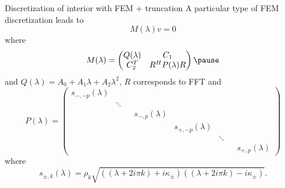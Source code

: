 \documentclass[10pt]{beamer}
\begin{document}
\begin{frame}
{Discretization of interior with FEM + truncation}
A particular type of FEM discretization leads to 
\[
  M(\lambda)v=0
\]
where
\[
  M(\lambda)=
  \begin{pmatrix}
    Q(\lambda) & C_1\\
    C_2^T & R^HP(\lambda)R
  \end{pmatrix}\pause
\]
and $Q(\lambda)=A_0+A_1\lambda+A_2\lambda^2$, $R$ corresponds to FFT \pause and
\[
  P(\lambda)=
  \begin{pmatrix}
    s_{-,-p}(\lambda)&   &   &        \\
    &  \ddots &   &   &   &  \\
    &   &   & s_{-,p}(\lambda)    \\
    &&&&s_{+,-p}(\lambda)&   &           \\
    &&&&&  \ddots &   &        \\
    &&&&&   &   & s_{+,p}(\lambda)   
  \end{pmatrix}
\]
where 
\[
s_{\pm,k}(\lambda)=\rho_k \sqrt{((\lambda+2i\pi k)+i\kappa_\pm)((\lambda+2i\pi k)-i\kappa_\pm)}.
\]
\end{frame}
\end{document}
